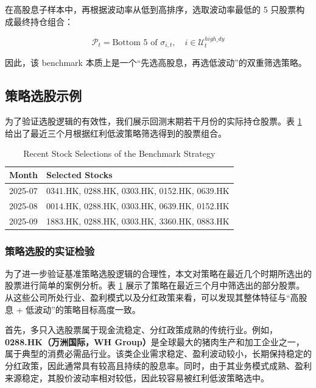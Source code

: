 \documentclass[a4paper,10pt]{article}
\begin{document}
在高股息子样本中，再根据波动率从低到高排序，选取波动率最低的 5 只股票构成最终持仓组合：

\begin{equation}
\mathcal{P}_t = \text{Bottom } 5 \text{ of } \sigma_{i,t}, \quad i \in \mathcal{U}_t^{high\_dy}
\end{equation}

因此，该 benchmark 本质上是一个“先选高股息，再选低波动”的双重筛选策略。



\subsection{策略选股示例}

为了验证选股逻辑的有效性，我们展示回测末期若干月份的实际持仓股票。表 \ref{tab:stock_selection} 给出了最近三个月根据红利低波策略筛选得到的股票组合。

\begin{table}[H]
\centering
\caption{Recent Stock Selections of the Benchmark Strategy}
\label{tab:stock_selection}
\begin{tabular}{ll}
\toprule
Month & Selected Stocks \\
\midrule
2025-07 & 0341.HK, 0288.HK, 0303.HK, 0152.HK, 0639.HK \\
2025-08 & 0014.HK, 0288.HK, 0303.HK, 0639.HK, 0152.HK \\
2025-09 & 1883.HK, 0288.HK, 0303.HK, 3360.HK, 0883.HK \\
\bottomrule
\end{tabular}
\end{table}


\subsubsection{策略选股的实证检验}

为了进一步验证基准策略选股逻辑的合理性，本文对策略在最近几个时期所选出的股票进行简单的案例分析。表 \ref{tab:stock_selection} 展示了策略在最近三个月中筛选出的部分股票。从这些公司所处行业、盈利模式以及分红政策来看，可以发现其整体特征与“高股息 + 低波动”的策略目标高度一致。

首先，多只入选股票属于现金流稳定、分红政策成熟的传统行业。例如，\textbf{0288.HK（万洲国际，WH Group）}是全球最大的猪肉生产和加工企业之一，属于典型的消费必需品行业。该类企业需求稳定、盈利波动较小，长期保持稳定的分红政策，因此通常具有较高且持续的股息率。同时，由于其业务模式成熟、盈利来源稳定，其股价波动率相对较低，因此较容易被红利低波策略选中。
\end{document}
